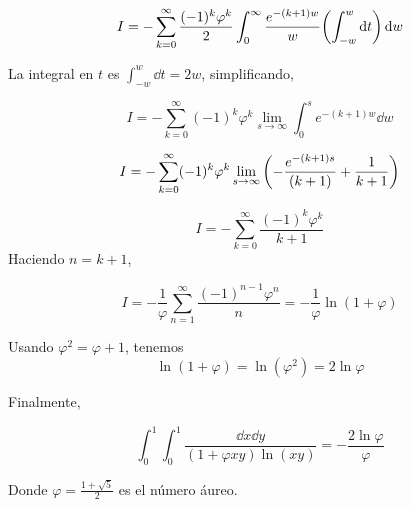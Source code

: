 {	$$  
	I = - \sum_{k=0}^\infty \frac{(-1)^k \varphi^k}{2} \int_0^\infty \frac{e^{-(k+1)w}}{ w} \pqty{\int_{-w}^w \dd{t}} \dd{w} 
	$$  
	
	La integral en $t$ es $\displaystyle \int_{-w}^w \dd{t} = 2w$, \; simplificando, 
	 
	$$
	I= -\sum_{k=0}^\infty (-1)^k \varphi^k  \lim\limits_{s \to \infty} \int_0^s e^{-(k+1)w} \dd{w}
	$$  
	
	$$  
	I  =-\sum_{k=0}^\infty (-1)^k \varphi^k \lim\limits_{s \to \infty} \pqty{- \frac{ e^{-(k+1)s}}{(k+1)} +  \frac{1}{k+1} }  
	$$
	
	$$
	I=- \sum_{k=0}^\infty \frac{(-1)^k \varphi^k}{k + 1}  
	$$  
	Haciendo $n = k + 1$,   
	
	$$  
	I = -\frac{1}{\varphi} \sum_{n=1}^\infty \frac{(-1)^{n-1} \varphi^n}{n} =- \frac{1}{\varphi} \ln(1 + \varphi)  
	$$  
	
	Usando $\varphi^2 = \varphi + 1$, tenemos  
	$$  
	\ln(1 + \varphi) = \ln(\varphi^2) = 2\ln\varphi 
	$$  
	
	 Finalmente,   
	
	
}
\begin{LnxRptaBox} 
	\begin{equation*}
		   \int_0^1 \int_0^1 \frac{ \dd{x}\dd{y}}{(1 + \varphi xy) \ln (xy)}=-\frac{2\ln\varphi}{\varphi}  
	\end{equation*} 
\end{LnxRptaBox} 
Donde  \( \varphi = \frac{1+\sqrt{5}}{2} \) es el número áureo.
